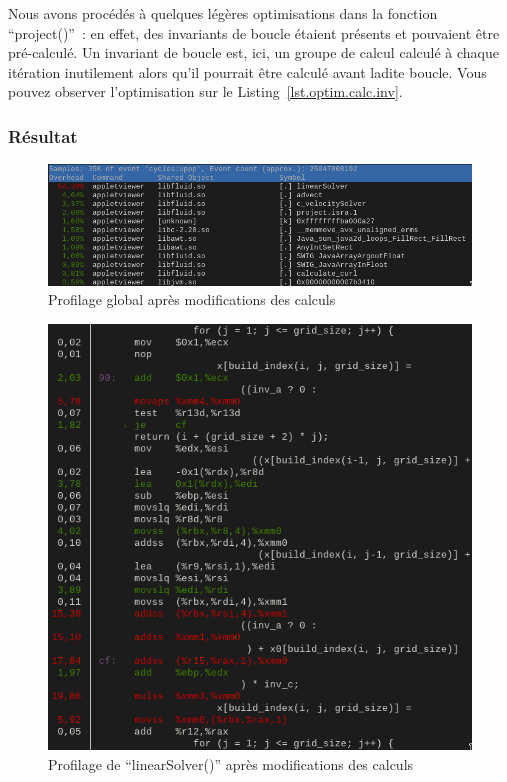 \documentclass[12pt,a4paper]{article}
\begin{document}
Nous avons procédés à quelques légères optimisations dans la fonction
\enquote{project()} : en effet, des invariants de boucle étaient présents et
pouvaient être pré-calculé. Un invariant de boucle est, ici, un groupe de calcul
calculé à chaque itération inutilement alors qu’il pourrait être calculé avant
ladite boucle. Vous pouvez observer l’optimisation sur le
Listing~\ref{lst.optim.calc.inv}.

\subsubsection{Résultat}
\label{sec.optim.calc.res}

\begin{figure}
    \centering
    \includegraphics[scale=0.55]{figures/optims/computing/global.png}
    \caption{Profilage global après modifications des calculs}
    \label{fig.optim.calc.global}
\end{figure}

\begin{figure}
    \centering
    \includegraphics[scale=0.55]{figures/optims/computing/linearSolver.png}
    \caption{Profilage de \enquote{linearSolver()} après modifications des calculs}
    \label{fig.optim.calc.linearSolver}
\end{figure}
\end{document}
